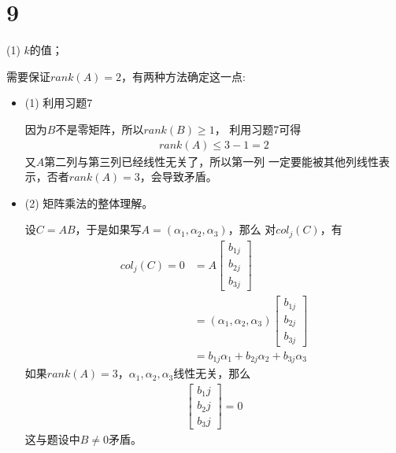 \documentclass{article}
\begin{document}
\section*{9}

 (1) $k$的值；

需要保证$rank(A) = 2$，有两种方法确定这一点:
\begin{itemize}
  \item (1) 利用习题7

        因为$B$不是零矩阵，所以$rank(B) \geq 1$，
        利用习题7可得
        \begin{align*}
          rank(A) \leq 3 - 1 = 2
        \end{align*}
        又$A$第二列与第三列已经线性无关了，所以第一列
        一定要能被其他列线性表示，否者$rank(A) = 3$，会导致矛盾。

  \item (2) 矩阵乘法的整体理解。

        设$C = AB$，于是如果写$A = (\alpha_1, \alpha_2, \alpha_3)$，那么
        对$col_j(C)$，有
        \begin{align*}
          col_j(C) = 0 & = A \begin{bmatrix}
                               b_{1j} \\
                               b_{2j} \\
                               b_{3j}
                             \end{bmatrix}                                 \\
                       & = (\alpha_1, \alpha_2, \alpha_3) \begin{bmatrix}
                                                            b_{1j} \\
                                                            b_{2j} \\
                                                            b_{3j}
                                                          \end{bmatrix}    \\
                       & = b_{1j}\alpha_1 + b_{2j}\alpha_2 + b_{3j}\alpha_3
        \end{align*}
        如果$rank(A) = 3$，$\alpha_1, \alpha_2, \alpha_3$线性无关，那么
        \begin{align*}
          \begin{bmatrix}
            b_1j \\
            b_2j \\
            b_3j
          \end{bmatrix} = 0
        \end{align*}
        这与题设中$B \neq 0$矛盾。
\end{itemize}
\end{document}
